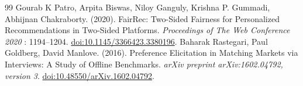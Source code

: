 \begin{thebibliography}{99}
Gourab K Patro, Arpita Biswas, Niloy Ganguly, Krishna P. Gummadi, Abhijnan Chakraborty. (2020). FairRec: Two-Sided Fairness for Personalized Recommendations in Two-Sided Platforms. \textit{Proceedings of The Web Conference 2020} : 1194–1204. \href{https://doi.org/10.1145/3366423.3380196}{doi:10.1145/3366423.3380196}.
Baharak Rastegari, Paul Goldberg, David Manlove. (2016). Preference Elicitation in Matching Markets via Interviews: A Study of Offline Benchmarks. \textit{arXiv preprint arXiv:1602.04792, version 3}. \href{https://arxiv.org/abs/1602.04792}{doi:10.48550/arXiv.1602.04792}.
\end{thebibliography}
